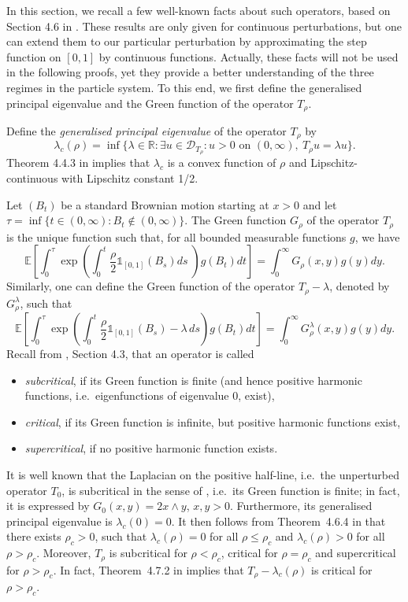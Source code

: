 \documentclass[11pt]{article}
\theoremstyle{plain}
\begin{document}
In this section, we recall a few well-known facts about such operators, based on Section 4.6 in \cite{Pinsky1995}. These results are only given for continuous perturbations, but one can extend them to our particular perturbation by approximating the step function on $[0,1]$ by continuous functions. Actually, these facts will not be used in the following proofs, yet they provide a better understanding of the three regimes in the particle system.  To this end, we first define the generalised principal eigenvalue and the Green function of the operator $T_\rho$.


Define the \emph{generalised principal eigenvalue} of the operator $T_\rho$ by
\[
\lambda_c(\rho) = \inf\{\lambda\in\mathbb{R}: \exists u\in \mathcal D_{T_\rho}: u>0\text{ on }(0,\infty),\ T_\rho u = \lambda u\}.
\]
Theorem 4.4.3 in \cite{Pinsky1995} implies that $\lambda_c$ is a convex function of $\rho$ and Lipschitz-continuous with Lipschitz constant 1/2.

Let $(B_t)$ be a standard Brownian motion starting at $x>0$ and let $\tau=\inf\{t\in(0,\infty):B_t\notin(0,\infty)\}$. The Green function $G_\rho$ of the operator $T_\rho$ is the unique function such that, for all bounded measurable functions $g$, we have 
\begin{equation*}
\mathbb{E}\left[\int_0^\tau\exp\left(\int_0^t\frac{\rho}{2}\mathbb{1}_{[0,1]}(B_s)ds\;\right)g(B_t)dt\right]=\int_0^\infty G_\rho(x,y) g(y)dy.
\end{equation*}
Similarly, one can define the Green function of the operator $T_\rho-\lambda$, denoted by $G_\rho^\lambda$, such that 
\begin{equation*}
\mathbb{E}\left[\int_0^\tau\exp\left(\int_0^t\frac{\rho}{2}\mathbb{1}_{[0,1]}(B_s)-\lambda\, ds\right)g(B_t)dt\right]=\int_0^\infty G^\lambda_\rho(x,y) g(y)dy.
\end{equation*}
Recall from \cite{Pinsky1995}, Section 4.3, that an operator is called 
\begin{itemize}
    \item \emph{subcritical}, if its Green function is finite (and hence positive harmonic functions, i.e.~eigenfunctions of eigenvalue 0, exist),
    \item \emph{critical}, if its Green function is infinite, but positive harmonic functions exist,
    \item \emph{supercritical}, if no positive harmonic function exists.
\end{itemize}
It is well known that the Laplacian on the positive half-line, i.e.~the unperturbed operator $T_0$, is subcritical in the sense of \cite{Pinsky1995}, i.e.~its Green function is finite; in fact, it is expressed by $G_0(x,y) = 2x\wedge y$, $x,y>0$. Furthermore, its generalised principal eigenvalue is $\lambda_c(0) = 0$. It then follows from Theorem~4.6.4 in \cite{Pinsky1995} that there exists $\rho_c > 0$, such that $\lambda_c(\rho) = 0$ for all $\rho \le \rho_c$ and $\lambda_c(\rho) > 0$ for all $\rho > \rho_c$. Moreover, $T_\rho$ is subcritical for $\rho < \rho_c$, critical for $\rho = \rho_c$ and supercritical for $\rho > \rho_c$. In fact, Theorem~4.7.2 in \cite{Pinsky1995} implies that $T_\rho-\lambda_c(\rho)$ is critical for $\rho >\rho_c$.
\end{document}
